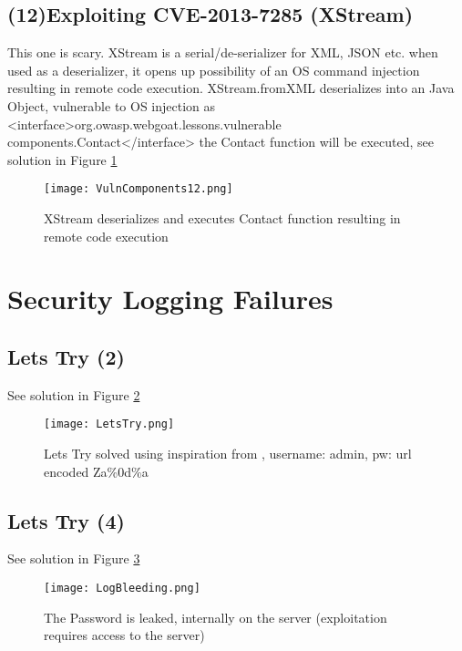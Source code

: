 \documentclass[
	letterpaper, %
	10pt, %
	unnumberedsections, %
	twoside, %
]{APAAssignment}
\begin{document}
\begin{appendices}
\subsection{(12)Exploiting CVE-2013-7285 (XStream)}\label{app:VulnAndOutdatedComponents12}\label{app:XStrem}
This one is scary. XStream is a serial/de-serializer for XML, JSON etc. when used as a deserializer, it opens up possibility of an OS command injection resulting in remote code execution. XStream.fromXML deserializes into an Java Object, vulnerable to OS injection as <interface>org.owasp.webgoat.lessons.vulnerable components.Contact</interface> the Contact function will be executed, see solution in Figure \ref{fig:app:vuln12}   

\begin{figure}[!ht] %
	\centering
	\texttt{[image: VulnComponents12.png]}
	\caption{XStream deserializes and executes Contact function resulting in remote code execution}
	\label{fig:app:vuln12}
\end{figure}

\section{Security Logging Failures}\label{app:SecurityLogging}
\subsection{Lets Try (2)}
See solution in Figure \ref{fig:app:LetsTry}

\begin{figure}[!htp] %
	\centering
	\texttt{[image: LetsTry.png]}
	\caption{Lets Try solved using inspiration from \cite{CycubicsDocsWebGoat}, username: admin, pw: url encoded Za\%0d\%a}
	\label{fig:app:LetsTry}
\end{figure}

\subsection{Lets Try (4)}
See solution in Figure \ref{fig:app:LogBleeding}

\begin{figure}[!htp] %
	\centering
	\texttt{[image: LogBleeding.png]}
	\caption{The Password is leaked, internally on the server (exploitation requires access to the server)}
	\label{fig:app:LogBleeding}
\end{figure}


\end{appendices}
\end{document}
